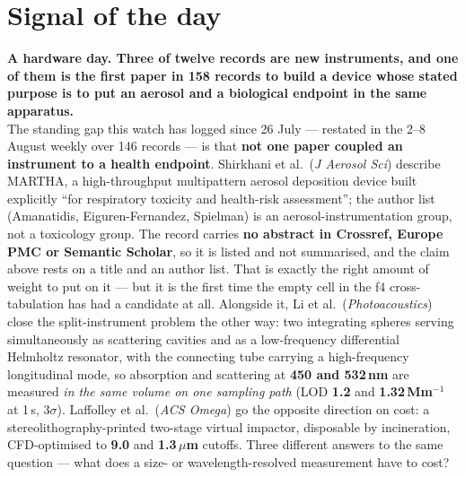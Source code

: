 \documentclass[10pt]{article}
\begin{document}
\vspace{6mm}

\section*{\sffamily\bfseries\color{Deep}Signal of the day}
\vspace{-1.5mm}{\color{Amber}\rule{\linewidth}{1.1pt}}\vspace{2.5mm}

\begin{keybox}
{\sffamily\bfseries\small\color{Deep}A hardware day. Three of twelve records are new
instruments, and one of them is the first paper in 158 records to build a device whose
stated purpose is to put an aerosol and a biological endpoint in the same
apparatus.}\\[1.4mm]
\footnotesize
The standing gap this watch has logged since 26 July --- restated in the 2--8 August
weekly over 146 records --- is that \textbf{not one paper coupled an instrument to a
health endpoint}. Shirkhani et al.\ (\textit{J Aerosol Sci}) describe MARTHA, a
high-throughput multipattern aerosol deposition device built explicitly ``for respiratory
toxicity and health-risk assessment''; the author list (Amanatidis, Eiguren-Fernandez,
Spielman) is an aerosol-instrumentation group, not a toxicology group. The record carries
\textbf{no abstract in Crossref, Europe PMC or Semantic Scholar}, so it is listed and not
summarised, and the claim above rests on a title and an author list. That is exactly the
right amount of weight to put on it --- but it is the first time the empty cell in the
f4 cross-tabulation has had a candidate at all.
Alongside it, Li et al.\ (\textit{Photoacoustics}) close the split-instrument problem the
other way: two integrating spheres serving simultaneously as scattering cavities and as a
low-frequency differential Helmholtz resonator, with the connecting tube carrying a
high-frequency longitudinal mode, so absorption and scattering at \textbf{450 and
532\,nm} are measured \emph{in the same volume on one sampling path}
(LOD \textbf{1.2} and \textbf{1.32\,Mm$^{-1}$} at 1\,s, 3$\sigma$). Laffolley et al.\
(\textit{ACS Omega}) go the opposite direction on cost: a stereolithography-printed
two-stage virtual impactor, disposable by incineration, CFD-optimised to
\textbf{9.0} and \textbf{1.3\,$\mu$m} cutoffs. Three different answers to the same
question --- what does a size- or wavelength-resolved measurement have to cost?
\end{keybox}
\end{document}
